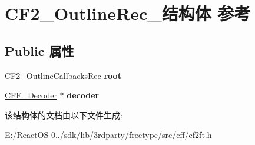 \hypertarget{struct_c_f2___outline_rec__}{}\section{C\+F2\+\_\+\+Outline\+Rec\+\_\+结构体 参考}
\label{struct_c_f2___outline_rec__}
\subsection*{Public 属性}
\begin{DoxyCompactItemize}
\item 
\mbox{\label{struct_c_f2___outline_rec___a401b21819b5895c2caa529c1ffe3cc8e}} 
\hyperlink{struct_c_f2___outline_callbacks_rec__}{C\+F2\+\_\+\+Outline\+Callbacks\+Rec} {\bfseries root}
\item 
\mbox{\label{struct_c_f2___outline_rec___a90df19247357508a152479a31427e8d7}} 
\hyperlink{struct_c_f_f___decoder__}{C\+F\+F\+\_\+\+Decoder} $\ast$ {\bfseries decoder}
\end{DoxyCompactItemize}


该结构体的文档由以下文件生成\+:\begin{DoxyCompactItemize}
\item 
E\+:/\+React\+O\+S-\/0../sdk/lib/3rdparty/freetype/src/cff/cf2ft.\+h\end{DoxyCompactItemize}

